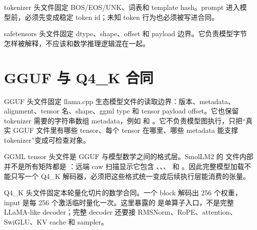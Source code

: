 

tokenizer 头文件固定 BOS/EOS/UNK、词表和 template hash。prompt 进入模型前，必须先变成稳定 token id；未知 token 行为也必须被写进合同。



safetensors 头文件固定 dtype、shape、offset 和 payload 边界。它负责模型字节怎样被解释，不应该和数学推理逻辑混在一起。



\section{GGUF 与 Q4\_K 合同}

GGUF 头文件固定 llama.cpp 生态模型文件的读取边界：版本、metadata、alignment、tensor 名、shape、ggml type 和 tensor payload offset。它也保留 tokenizer 需要的字符串数组 metadata，例如  和 。它不负责模型图执行，只把“真实 GGUF 文件里有哪些 tensor、每个 tensor 在哪里、哪些 metadata 能支撑 tokenizer”变成可检查对象。



GGML tensor 头文件是 GGUF 与模型数学之间的格式层。SmolLM2 的  文件内部并不是所有矩阵都是 ：远端 caw 扫描显示它包含 、、、 和 。因此完整模型加载不能只写一个 Q4\_K 解码器，必须把这些格式统一变成后续执行层能消费的张量。



Q4\_K 头文件固定本轮量化切片的数学合同。一个  block 解码出 256 个权重， input 是每 256 个激活临时量化一次。这里暴露的  是单算子入口，不是完整 LLaMA-like decoder；完整 decoder 还要接 RMSNorm、RoPE、attention、SwiGLU、KV cache 和 sampler。




